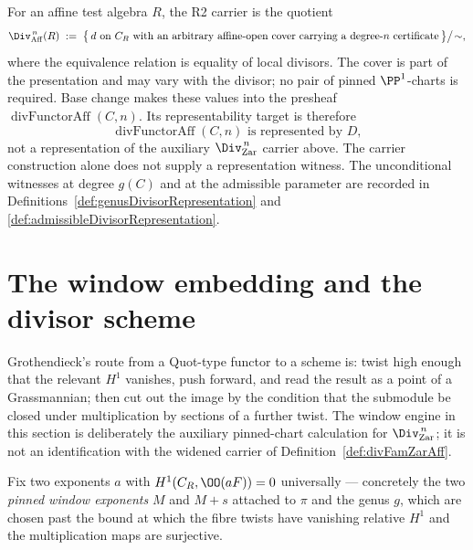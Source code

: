 \begin{definition}
  \label{def:divFamZarAff}
  \leanok
  For an affine test algebra \(R\), the R2 carrier is the quotient
  \[
    \Div^{\,n}_{\mathrm{Aff}}(R) \;:=\;
      \bigl\{\,d\text{ on }C_R\text{ with an arbitrary affine-open cover carrying a
      degree-}n\text{ certificate}\,\bigr\}\big/\!\sim,
  \]
  where the equivalence relation is equality of local divisors. The cover is part of the
  presentation and may vary with the divisor; no pair of pinned \(\PP^1\)-charts is required.
  Base change makes these values into the presheaf
  \(\operatorname{divFunctorAff}(C,n)\). Its representability target is therefore
  \[
    \operatorname{divFunctorAff}(C,n)\text{ is represented by }D,
  \]
  not a representation of the auxiliary \(\Div^{\,n}_{\mathrm{Zar}}\) carrier above.
  The carrier construction alone does not supply a representation witness.  The
  unconditional witnesses at degree \(g(C)\) and at the admissible parameter are recorded in
  Definitions~\ref{def:genusDivisorRepresentation} and
  \ref{def:admissibleDivisorRepresentation}.
\end{definition}

\section{The window embedding and the divisor scheme}
\label{sec:divscheme}

Grothendieck's route from a Quot-type functor to a scheme is: twist high enough that the
relevant \(H^1\) vanishes, push forward, and read the result as a point of a Grassmannian;
then cut out the image by the condition that the submodule be closed under multiplication
by sections of a further twist. The window engine in this section is deliberately the
auxiliary pinned-chart calculation for \(\Div^{\,n}_{\mathrm{Zar}}\); it is not an identification
with the widened carrier of Definition~\ref{def:divFamZarAff}.

Fix two exponents \(a\) with \(H^1(C_R, \OO(aF)) = 0\) universally --- concretely the two
\emph{pinned window exponents} \(M\) and \(M+s\) attached to \(\pi\) and the genus \(g\),
which are chosen past the bound at which the fibre twists have vanishing relative \(H^1\)
and the multiplication maps are surjective.

